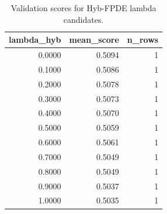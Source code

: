 \begin{table}[t]
\caption{Validation scores for Hyb-FPDE lambda candidates.}
\label{tab:lambda_distribution_computed}
\centering
\begin{tabular}{rrr}
\toprule
lambda\_hyb & mean\_score & n\_rows \\
\midrule
0.0000 & 0.5094 & 1 \\
0.1000 & 0.5086 & 1 \\
0.2000 & 0.5078 & 1 \\
0.3000 & 0.5073 & 1 \\
0.4000 & 0.5070 & 1 \\
0.5000 & 0.5059 & 1 \\
0.6000 & 0.5061 & 1 \\
0.7000 & 0.5049 & 1 \\
0.8000 & 0.5049 & 1 \\
0.9000 & 0.5037 & 1 \\
1.0000 & 0.5035 & 1 \\
\bottomrule
\end{tabular}

\end{table}

